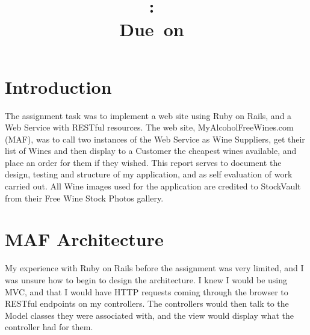 \documentclass[12pt]{article}
\title{
\vspace{2in}
\textmd{\textbf{\hmwkClass:\ \hmwkTitle}}\\
\normalsize\vspace{0.1in}\small{Due\ on\ \hmwkDueDate}\\
\vspace{3in}
}
\author{\textbf{\hmwkAuthorName}}
\date{} %
\begin{document}
\maketitle



\newpage
\tableofcontents
\newpage



\section{Introduction}

The assignment task\cite{assignment} was to implement a web site using Ruby on Rails, and a Web Service with RESTful resources. The web site, MyAlcoholFreeWines.com (MAF), was to call two instances of the Web Service as Wine Suppliers, get their list of Wines and then display to a Customer the cheapest wines available, and place an order for them if they wished. This report serves to document the design, testing and structure of my application, and as self evaluation of work carried out. All Wine images used for the application are credited to StockVault\cite{stockvault} from their Free Wine Stock Photos gallery.


\section{MAF Architecture}
My experience with Ruby on Rails before the assignment was very limited, and I was unsure how to begin to design the architecture. I knew I would be using MVC, and that I would have HTTP requests coming through the browser to RESTful endpoints on my controllers. The controllers would then talk to the Model classes they were associated with, and the view would display what the controller had for them.
\end{document}

